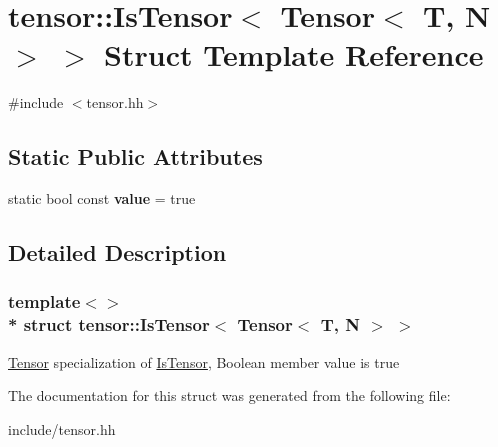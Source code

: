 \hypertarget{structtensor_1_1IsTensor_3_01Tensor_3_01T_00_01N_01_4_01_4}{}\section{tensor\+:\+:Is\+Tensor$<$ Tensor$<$ T, N $>$ $>$ Struct Template Reference}
\label{structtensor_1_1IsTensor_3_01Tensor_3_01T_00_01N_01_4_01_4}


{\ttfamily \#include $<$tensor.\+hh$>$}

\subsection*{Static Public Attributes}
\begin{DoxyCompactItemize}
\item 
static bool const {\bfseries value} = true\hypertarget{structtensor_1_1IsTensor_3_01Tensor_3_01T_00_01N_01_4_01_4_a27031e5a471496059b9bec3b5b61092a}{}\label{structtensor_1_1IsTensor_3_01Tensor_3_01T_00_01N_01_4_01_4_a27031e5a471496059b9bec3b5b61092a}

\end{DoxyCompactItemize}


\subsection{Detailed Description}
\subsubsection*{template$<$$>$\\*
struct tensor\+::\+Is\+Tensor$<$ Tensor$<$ T, N $>$ $>$}

\hyperlink{classtensor_1_1Tensor}{Tensor} specialization of \hyperlink{structtensor_1_1IsTensor}{Is\+Tensor}, Boolean member {\ttfamily value} is true 

The documentation for this struct was generated from the following file\+:\begin{DoxyCompactItemize}
\item 
include/tensor.\+hh\end{DoxyCompactItemize}
